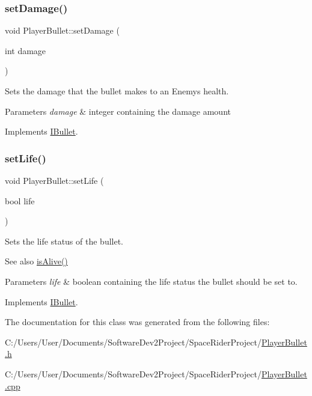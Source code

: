 \subsubsection{\texorpdfstring{set\+Damage()}{setDamage()}}
{\footnotesize\ttfamily void Player\+Bullet\+::set\+Damage (\begin{DoxyParamCaption}\item[{int}]{damage }\end{DoxyParamCaption})\hspace{0.3cm}{\ttfamily [virtual]}}



Sets the damage that the bullet makes to an Enemy\textquotesingle{}s health. 


\begin{DoxyParams}{Parameters}
{\em damage} & integer containing the damage amount \\
\hline
\end{DoxyParams}


Implements \hyperlink{class_i_bullet_a072298555accb47f11b84f4c781ae876}{I\+Bullet}.

\mbox{\label{class_player_bullet_af713549c4bb9a2400a7929564f5b81ff}} 
\subsubsection{\texorpdfstring{set\+Life()}{setLife()}}
{\footnotesize\ttfamily void Player\+Bullet\+::set\+Life (\begin{DoxyParamCaption}\item[{bool}]{life }\end{DoxyParamCaption})\hspace{0.3cm}{\ttfamily [virtual]}}



Sets the life status of the bullet. 

\begin{DoxySeeAlso}{See also}
\hyperlink{class_player_bullet_ab4e6b1485e9a63ddc00effc7532a9b09}{is\+Alive()} 
\end{DoxySeeAlso}

\begin{DoxyParams}{Parameters}
{\em life} & boolean containing the life status the bullet should be set to. \\
\hline
\end{DoxyParams}


Implements \hyperlink{class_i_bullet_abf99befdaa121e7c9ca2acc2ed75b513}{I\+Bullet}.



The documentation for this class was generated from the following files\+:\begin{DoxyCompactItemize}
\item 
C\+:/\+Users/\+User/\+Documents/\+Software\+Dev2\+Project/\+Space\+Rider\+Project/\hyperlink{_player_bullet_8h}{Player\+Bullet.\+h}\item 
C\+:/\+Users/\+User/\+Documents/\+Software\+Dev2\+Project/\+Space\+Rider\+Project/\hyperlink{_player_bullet_8cpp}{Player\+Bullet.\+cpp}\end{DoxyCompactItemize}
